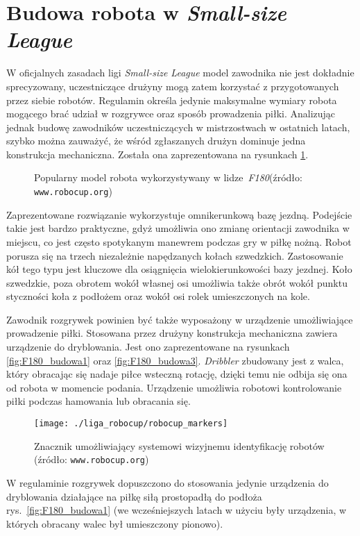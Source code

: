 \section{Budowa robota \label{sec:budowa_robota} w \emph{Small-size League}}
	W oficjalnych zasadach ligi \emph{Small-size League} model zawodnika nie jest dokładnie sprecyzowany, uczestniczące drużyny mogą zatem korzystać z przygotowanych przez siebie robotów.
	Regulamin określa jedynie maksymalne wymiary robota mogącego brać udział w rozgrywce oraz sposób prowadzenia piłki. Analizując jednak budowę zawodników uczestniczących w mistrzostwach
	w ostatnich latach, szybko można zauważyć, że wśród zgłaszanych drużyn dominuje jedna konstrukcja mechaniczna.
	Została ona zaprezentowana na  rysunkach \ref{fig:F180_budowa}.
	\begin{figure}
	\centering
	\caption{Popularny model robota wykorzystywany w \mbox{lidze \emph{F180}}\newline(źródło: \texttt{www.robocup.org}) }
	\label{fig:F180_budowa}
	\end{figure}
	Zaprezentowane rozwiązanie wykorzystuje omnikerunkową bazę jezdną. Podejście takie jest bardzo praktyczne, gdyż umożliwia ono zmianę orientacji zawodnika w miejscu, co jest często
	spotykanym manewrem podczas gry w piłkę nożną. Robot porusza się na trzech niezależnie napędzanych kołach szwedzkich. Zastosowanie kół tego typu jest kluczowe dla osiągnięcia wielokierunkowości
	bazy jezdnej. Koło szwedzkie, poza obrotem wokół własnej osi umożliwia także obrót wokół punktu styczności koła z podłożem oraz wokół osi rolek umieszczonych na kole.
	
	Zawodnik rozgrywek powinien być także wyposażony w urządzenie umożliwiające prowadzenie piłki. Stosowana przez drużyny konstrukcja mechaniczna zawiera urządzenie do dryblowania. Jest ono zaprezentowane
	na rysunkach \ref{fig:F180_budowa1} oraz \ref{fig:F180_budowa3}. 
	\textit{Dribbler} zbudowany jest z walca, który obracając się nadaje piłce wsteczną rotację, dzięki temu nie odbija się ona od robota w momencie podania.
	Urządzenie umożliwia robotowi kontrolowanie piłki podczas hamowania lub obracania się.
	\begin{wrapfigure}{r}{0.42\textwidth}
	\vspace{-20pt}
	\begin{center}	
	\texttt{[image: ./liga\_robocup/robocup\_markers]}
	\end{center}
	\caption{Znacznik umożliwiający systemowi wizyjnemu identyfikację robotów \newline(źródło: \texttt{www.robocup.org})\label{fig:znacznik}}
	\vspace{-10pt}
	\end{wrapfigure}
	W regulaminie rozgrywek dopuszczono do stosowania jedynie urządzenia do dryblowania działające na piłkę siłą prostopadłą do podłoża rys.~\ref{fig:F180_budowa1} (we wcześniejszych latach
	w użyciu były urządzenia, w których obracany walec był umieszczony pionowo).

